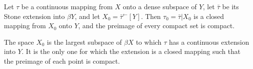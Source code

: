Let $\tau$ be a continuous mapping from $X$ onto a dense subspace of $Y$, let $\bar{\tau}$ be its Stone extension into $\beta Y$, and let $X_0 = \bar{\tau}^{\leftarrow}[Y]$. Then $\tau_0 = \bar{\tau}|X_0$ is a closed mapping from $X_0$ onto $Y$, and the preimage of every compact set is compact.

The space $X_0$ is the largest subspace of $\beta X$ to which $\tau$ has a continuous extension into $Y$. It is the only one for which the extension is a closed mapping such that the preimage of each point is compact.
